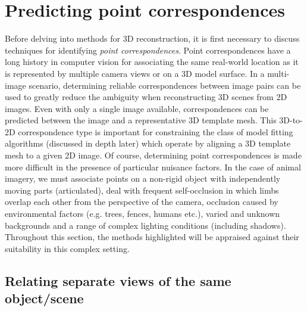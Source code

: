 \section{Predicting point correspondences}

Before delving into methods for 3D reconstruction, it is first necessary to discuss techniques for identifying \emph{point correspondences}. Point correspondences have a long history in computer vision for associating the same real-world location as it is represented by multiple camera views or on a 3D model surface. In a multi-image scenario, determining reliable correspondences between image pairs can be used to greatly reduce the ambiguity when reconstructing 3D scenes from 2D images. Even with only a single image available, correspondences can be predicted between the image and a representative 3D template mesh. This 3D-to-2D correspondence type is important for constraining the class of model fitting algorithms (discussed in depth later) which operate by aligning a 3D template mesh to a given 2D image. Of course, determining point correspondences is made more difficult in the presence of particular nuisance factors. In the case of animal imagery, we must associate points on a non-rigid object with independently moving parts (articulated), deal with frequent self-occlusion in which limbs overlap each other from the perspective of the camera, occlusion caused by environmental factors (e.g. trees, fences, humans etc.), varied and unknown backgrounds and a range of complex lighting conditions (including shadows). Throughout this section, the methods highlighted will be appraised against their suitability in this complex setting.


\subsection{Relating separate views of the same object/scene}

